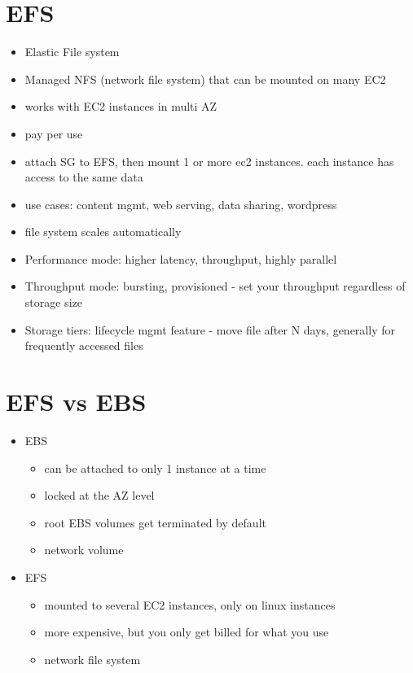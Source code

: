 \documentclass[]{scrartcl}
\begin{document}
\section{EFS}
\begin{itemize}
	\item Elastic File system
	\item Managed NFS (network file system) that can be mounted on many EC2
	\item works with EC2 instances in multi AZ
	\item pay per use
	\item attach SG to EFS, then mount 1 or more ec2 instances. each instance has access to the same data
	\item use cases: content mgmt, web serving, data sharing, wordpress
	\item file system scales automatically
	\item Performance mode: higher latency, throughput, highly parallel
	\item Throughput mode: bursting, provisioned - set your throughput regardless of storage size
	\item Storage tiers: lifecycle mgmt feature - move file after N days, generally for frequently accessed files
\end{itemize}

\section{EFS vs EBS}
\begin{itemize}
	\item EBS
	\begin{itemize}
		\item can be attached to only 1 instance at a time
		\item locked at the AZ level
		\item root EBS volumes get terminated by default
		\item network volume
	\end{itemize}
	\item EFS
	\begin{itemize}
		\item mounted to several EC2 instances, only on linux instances
		\item more expensive, but you only get billed for what you use
		\item network file system
	\end{itemize}
\end{itemize}
\end{document}
